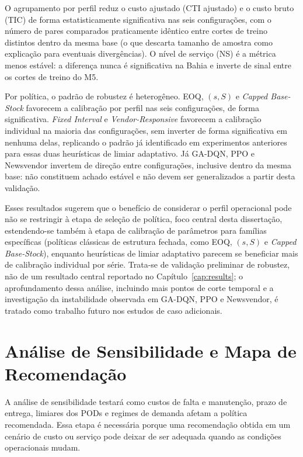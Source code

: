 O agrupamento por perfil reduz o custo ajustado (CTI ajustado) e o custo bruto (TIC) de forma estatisticamente significativa nas seis configurações, com o número de pares comparados praticamente idêntico entre cortes de treino distintos dentro da mesma base (o que descarta tamanho de amostra como explicação para eventuais divergências). O nível de serviço (NS) é a métrica menos estável: a diferença nunca é significativa na Bahia e inverte de sinal entre os cortes de treino do M5.

Por política, o padrão de robustez é heterogêneo. EOQ, $(s,S)$ e \textit{Capped Base-Stock} favorecem a calibração por perfil nas seis configurações, de forma significativa. \textit{Fixed Interval} e \textit{Vendor-Responsive} favorecem a calibração individual na maioria das configurações, sem inverter de forma significativa em nenhuma delas, replicando o padrão já identificado em experimentos anteriores para essas duas heurísticas de limiar adaptativo. Já GA-DQN, PPO e Newsvendor invertem de direção entre configurações, inclusive dentro da mesma base: não constituem achado estável e não devem ser generalizados a partir desta validação.

Esses resultados sugerem que o benefício de considerar o perfil operacional pode não se restringir à etapa de seleção de política, foco central desta dissertação, estendendo-se também à etapa de calibração de parâmetros para famílias específicas (políticas clássicas de estrutura fechada, como EOQ, $(s,S)$ e \textit{Capped Base-Stock}), enquanto heurísticas de limiar adaptativo parecem se beneficiar mais de calibração individual por série. Trata-se de validação preliminar de robustez, não de um resultado central reportado no Capítulo~\ref{cap:results}; o aprofundamento dessa análise, incluindo mais pontos de corte temporal e a investigação da instabilidade observada em GA-DQN, PPO e Newsvendor, é tratado como trabalho futuro nos estudos de caso adicionais.

\section{Análise de Sensibilidade e Mapa de Recomendação}

A análise de sensibilidade testará como custos de falta e manutenção, prazo de entrega, limiares dos PODs e regimes de demanda afetam a política recomendada. Essa etapa é necessária porque uma recomendação obtida em um cenário de custo ou serviço pode deixar de ser adequada quando as condições operacionais mudam.

